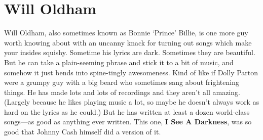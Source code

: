 \documentclass[letterpaper,single]{article}
\begin{document}
\section{Will Oldham}
Will Oldham, also sometimes known as Bonnie `Prince' Billie, is one
more guy worth knowing about with an uncanny knack for turning out
songs which make your insides squishy. Sometime his lyrics are dark.
Sometimes they are beautiful. But he can take a plain-seeming phrase and
stick it to a bit of music, and somehow it just bends into spine-tingly
awesomeness. Kind of like if Dolly Parton were a grumpy guy with a big
beard who sometimes sang about frightening things. He has made lots and
lots of recordings and they aren't all amazing. (Largely because he
likes playing music a lot, so maybe he doesn't always work as hard on
the lyrics as he could.) But he has written at least a dozen world-class
songs---as good as anything ever written. This one, \textbf{I See A
Darkness}, was so good that Johnny Cash himself did a version of it.\\
\\
\\
\end{document}
